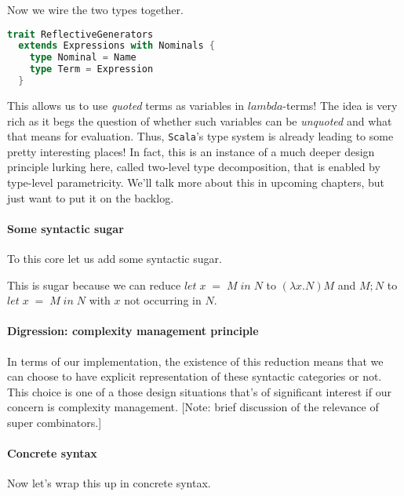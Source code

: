 Now we wire the two types together.

\begin{lstlisting}[language=Scala]
  trait ReflectiveGenerators
  extends Expressions with Nominals {
    type Nominal = Name
    type Term = Expression
  }
\end{lstlisting}

This allows us to use \emph{quoted} terms as variables in
$lambda$-terms! The idea is very rich as it begs the question of
whether such variables can be \emph{unquoted} and what that means for
evaluation. Thus, \texttt{Scala}'s type system is already leading
to some pretty interesting places! In fact, this is an instance of a
much deeper design principle lurking here, called two-level type
decomposition, that is enabled by type-level parametricity. We'll talk
more about this in upcoming chapters, but just want to put it on the
backlog.

\paragraph{Some syntactic sugar}
To this core let us add some syntactic sugar.


This is sugar because we can reduce $let \; x \; = \; M \; in \; N$ to
$(\lambda x. N) M$ and $ M; N$ to $let \; x \; = \; M \; in \; N$ with
$x$ not occurring in $N$.

\paragraph{Digression: complexity management principle} In terms of
our implementation, the existence of this reduction means that we can
choose to have explicit representation of these syntactic categories
or not. This choice is one of a those design situations that's of
significant interest if our concern is complexity management. [Note:
brief discussion of the relevance of super combinators.]

\paragraph{Concrete syntax}
Now let's wrap this up in concrete syntax.

